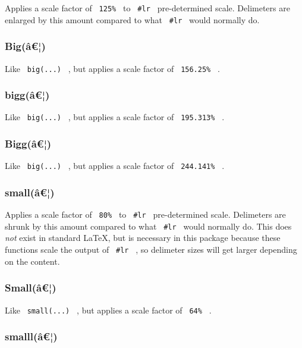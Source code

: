 Applies a scale factor of \texttt{\ 125\%\ } to \texttt{\ \#lr\ }
pre-determined scale. Delimeters are enlarged by this amount compared to
what \texttt{\ \#lr\ } would normally do.

\subsubsection{Big(â€¦)}\label{biguxe2-1}

Like \texttt{\ big(...)\ } , but applies a scale factor of
\texttt{\ 156.25\%\ } .

\subsubsection{bigg(â€¦)}\label{bigguxe2}

Like \texttt{\ big(...)\ } , but applies a scale factor of
\texttt{\ 195.313\%\ } .

\subsubsection{Bigg(â€¦)}\label{bigguxe2-1}

Like \texttt{\ big(...)\ } , but applies a scale factor of
\texttt{\ 244.141\%\ } .

\subsubsection{small(â€¦)}\label{smalluxe2}

Applies a scale factor of \texttt{\ 80\%\ } to \texttt{\ \#lr\ }
pre-determined scale. Delimeters are shrunk by this amount compared to
what \texttt{\ \#lr\ } would normally do. This does \emph{not} exist in
standard LaTeX, but is necessary in this package because these functions
scale the output of \texttt{\ \#lr\ } , so delimeter sizes will get
larger depending on the content.

\subsubsection{Small(â€¦)}\label{smalluxe2-1}

Like \texttt{\ small(...)\ } , but applies a scale factor of
\texttt{\ 64\%\ } .

\subsubsection{smalll(â€¦)}\label{smallluxe2}

